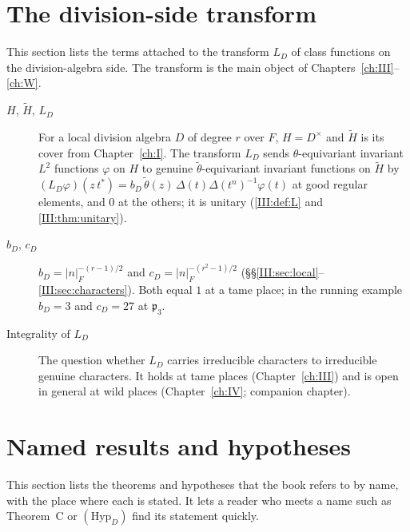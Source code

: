 \section{The division-side transform}\label{gl:transform}
This section lists the terms attached to the transform $L_D$ of class functions on the division-algebra side. The transform is the main object of Chapters~\ref{ch:III}--\ref{ch:W}.

\begin{description}
\item[$H$, $\widetilde H$, $L_D$] For a local division algebra $D$ of
degree $r$ over $F$, $H=D^\times$ and $\widetilde H$ is its cover from
Chapter~\ref{ch:I}.  The transform $L_D$ sends $\theta$-equivariant invariant
$L^2$ functions $\varphi$ on $H$ to genuine
$\tilde\theta$-equivariant invariant functions on $\widetilde H$ by
$(L_D\varphi)(z\,t^*)=b_D\,\tilde\theta(z)\,\Delta(t)\Delta(t^n)^{-1}\varphi(t)$
at good regular elements, and $0$ at the others; it is unitary
(\cref{III:def:L} and \cref{III:thm:unitary}).
\item[$b_D$, $c_D$] $b_D=|n|_F^{-(r-1)/2}$ and
$c_D=|n|_F^{-(r^2-1)/2}$ (\S\S\ref{III:sec:local}--\ref{III:sec:characters}).  Both equal $1$ at a
tame place; in the running example $b_D=3$ and $c_D=27$ at
$\mathfrak p_3$.
\item[Integrality of $L_D$] The question whether $L_D$ carries
irreducible characters to irreducible genuine characters.  It holds at
tame places (Chapter~\ref{ch:III}) and is open in general at wild places
(Chapter~\ref{ch:IV}; companion chapter).
\end{description}

\section{Named results and hypotheses}\label{gl:named}
This section lists the theorems and hypotheses that the book refers to by name, with the place where each is stated. It lets a reader who meets a name such as Theorem~C or $(\mathrm{Hyp}_D)$ find its statement quickly.

